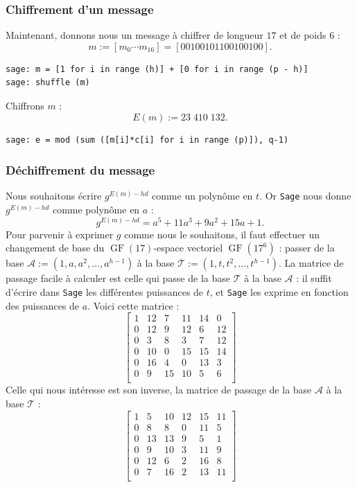 \documentclass[a4paper, titlepage, 11pt]{article}
\theoremstyle{definition}
\theoremstyle{remark}
\def\gf{\operatorname{GF}}
\begin{document}
\subsubsection{Chiffrement d'un message}
Maintenant, donnons nous un message à chiffrer de longueur $17$ et de poids $6$ :
$$m := [m_0\cdots m_{16}] = [00100101100100100].$$
\begin{verbatim}
sage: m = [1 for i in range (h)] + [0 for i in range (p - h)]
sage: shuffle (m)
\end{verbatim}
Chiffrons $m$ :
$$E(m) := 23\;410\;132.$$
\begin{verbatim}
sage: e = mod (sum ([m[i]*c[i] for i in range (p)]), q-1)
\end{verbatim}

\subsubsection{Déchiffrement du message}
Nous souhaitons écrire $g^{E(m) - hd}$ comme un polynôme en $t$. Or \verb|Sage| nous donne $g^{E(m) - hd}$ comme polynôme en $a$ : $$g^{E(m) - hd} = a^5 + 11a^3 + 9a^2 + 15a + 1.$$
Pour parvenir à exprimer $g$ comme nous le souhaitons, il faut effectuer un changement de base du $\gf(17)$-espace vectoriel $\gf(17^6)$ : passer de la base $\mathcal{A} := (1, a, a^2, \dots, a^{h-1})$ à la base $\mathcal{T} := (1, t, t^2, \dots, t^{h-1})$.
La matrice de passage facile à calculer est celle qui passe de la base $\mathcal{T}$ à la base $\mathcal{A}$ : il suffit d'écrire dans \verb|Sage| les différentes puissances de $t$, et \verb|Sage| les exprime en fonction des puissances de $a$. Voici cette matrice :
$$\left[\begin{array}{cccccc}
1 & 12 & 7 & 11 & 14 & 0 \\
0 & 12 & 9 & 12 & 6 & 12 \\
0 & 3 & 8 & 3 & 7 & 12 \\
0 & 10 & 0 & 15 & 15 & 14 \\
0 & 16 & 4 & 0 & 13 & 3 \\
0 & 9 & 15 & 10 & 5 & 6 \\
\end{array}\right]$$
Celle qui nous intéresse est son inverse, la matrice de passage de la base $\mathcal{A}$ à la base $\mathcal{T}$ :
$$\left[\begin{array}{cccccc}
1 & 5 & 10 & 12 & 15 & 11 \\
0 & 8 & 8 & 0 & 11 & 5 \\
0 & 13 & 13 & 9 & 5 & 1 \\
0 & 9 & 10 & 3 & 11 & 9 \\
0 & 12 & 6 & 2 & 16 & 8 \\
0 & 7 & 16 & 2 & 13 & 11 \\
\end{array}\right]$$
\end{document}
